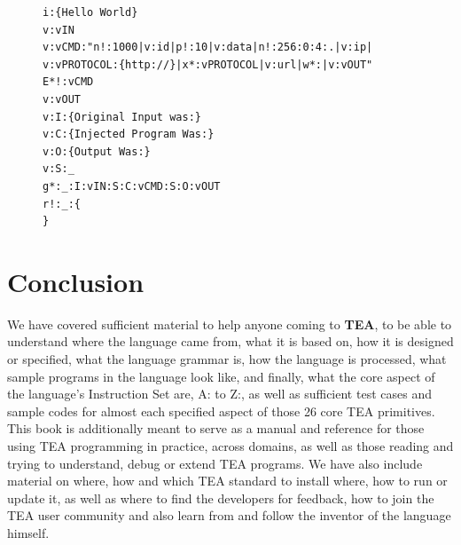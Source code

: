 \documentclass[a4paper, 18pt]{book} %
\begin{document}
 \begin{figure}[H]
 \Large
  \begin{tcolorbox}[teaterminalstyle, title=TEA Program: TEA VIRUS Example]
  \begin{lstlisting}[language=TEA]
i:{Hello World}
v:vIN
v:vCMD:"n!:1000|v:id|p!:10|v:data|n!:256:0:4:.|v:ip|
v:vPROTOCOL:{http://}|x*:vPROTOCOL|v:url|w*:|v:vOUT"
E*!:vCMD
v:vOUT
v:I:{Original Input was:}
v:C:{Injected Program Was:}
v:O:{Output Was:}
v:S:_
g*:_:I:vIN:S:C:vCMD:S:O:vOUT
r!:_:{
}
   \end{lstlisting}
  \end{tcolorbox}
  \label{FIGE2}
\end{figure}









\chapter{Conclusion}
\label{SECCONC}



We have covered sufficient material to help anyone coming to \textbf{TEA}, to be able to understand where the language came from, what it is based on, how it is designed or specified, what the language grammar is, how the language is processed, what sample programs in the language look like, and finally, what the core aspect of the language's Instruction Set are, A: to Z:, as well as sufficient test cases and sample codes for almost each specified aspect of those 26 core TEA primitives. This book is additionally meant to serve as a manual and reference for those using TEA programming in practice, across domains, as well as those reading and trying to understand, debug or extend TEA programs. We have also include material on where, how and which TEA standard to install where, how to run or update it, as well as where to find the developers for feedback, how to join the TEA user community and also learn from and follow the inventor of the language himself.




\begin{appendices}





\end{appendices}
\end{document}
